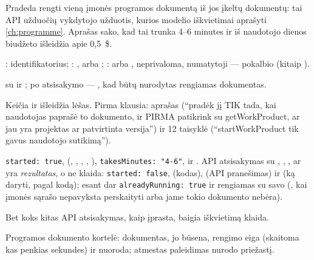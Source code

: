 \begin{description}[style=multiline, leftmargin=19mm, labelwidth=17mm, labelsep=2mm,
  font=\sffamily\bfseries\footnotesize\color{ink}, itemsep=1pt, topsep=2pt, before=\raggedright]
  \item[Paskirtis] Pradeda rengti vieną įmonės programos dokumentą iš jos įkeltų dokumentų: tai API
    užduočių vykdytojo užduotis, kurios modelio iškvietimai aprašyti \cref{ch:programme}.
    Aprašas sako, kad tai trunka 4--6 minutes ir iš naudotojo dienos biudžeto išleidžia apie
    0,5~\$.
  \item[Įvestis] : identifikatorius; : ,
     arba ; :  arba ,
    neprivaloma, numatytoji --- pokalbio (kitaip ).
  \item[Užklausos]  su  ir
    ; po atsisakymo  ---
    , kad būtų nurodytas rengiamas dokumentas.
  \item[Pobūdis] Keičia ir išleidžia lėšas. Pirma klausia: aprašas (\enquote{pradėk jį TIK tada,
    kai naudotojas paprašė to dokumento, ir PIRMA patikrink su getWorkProduct, ar jau yra
    projektas ar patvirtinta versija}) ir 12 taisyklė (\enquote{startWorkProduct tik gavus
    naudotojo sutikimą}).
  \item[Grąžina] \texttt{started: true},  (, , ,
    , ), \texttt{takesMinutes: "4-6"},  ir .
    API atsisakymas su , , ,
     ar  yra \emph{rezultatas}, o ne klaida:
    \texttt{started: false},  (kodas),  (API pranešimas) ir
     (ką daryti, pagal kodą); esant  dar
    \texttt{alreadyRunning: true} ir rengiamas  su savo  (,
    kai įmonės sąrašo nepavyksta perskaityti arba jame tokio dokumento nebėra).
  \item[Klaidos] Bet koks kitas API atsisakymas, kaip įprasta, baigia iškvietimą klaida.
  \item[Konsolė] Programos dokumento kortelė: dokumentas, jo būsena, rengimo eiga (skaitoma kas
    penkias sekundes) ir nuoroda; atmestas paleidimas nurodo priežastį.
\end{description}

